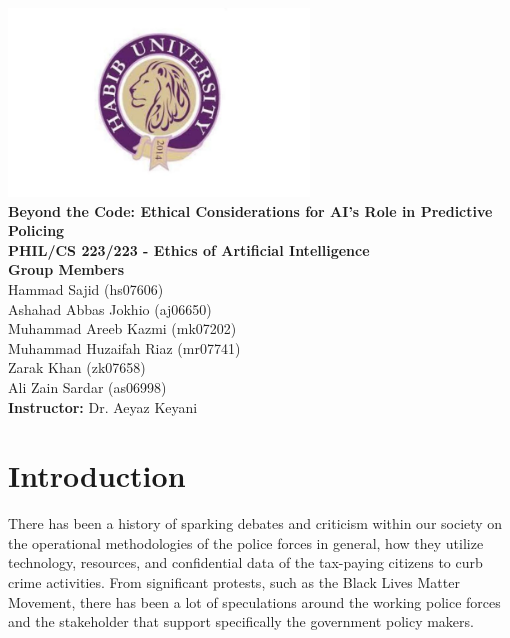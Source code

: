 \documentclass[man, noextraspace]{apa7} %
\begin{document}
\begin{center}
    {\includegraphics[width=8cm]{HabibLogo.png}} \\
    \vspace{10mm}
    {\LARGE \textbf{Beyond the Code: Ethical Considerations for AI's Role in Predictive Policing}} \\
    \vspace{5mm}
    {\Large \textbf{PHIL/CS 223/223 - Ethics of Artificial Intelligence}} \\
    \vspace{10mm}
    {\Large \textbf{Group Members}} \\
    \vspace{5mm}
    {\large Hammad Sajid (hs07606)} \\
    \vspace{2mm}
    {\large Ashahad Abbas Jokhio (aj06650)} \\
    \vspace{2mm}
    {\large Muhammad Areeb Kazmi (mk07202)} \\
    \vspace{2mm}
    {\large Muhammad Huzaifah Riaz (mr07741)} \\
    \vspace{2mm}
    {\large Zarak Khan (zk07658)} \\
    \vspace{2mm}
    {\large Ali Zain Sardar (as06998)}\\
    \vspace{4mm}
    {\large \textbf{Instructor:} Dr. Aeyaz Keyani} \\
\end{center}

\newpage

\tableofcontents
\newpage

\section{Introduction}
There has been a history of sparking debates and criticism within our society on the 
operational methodologies of the police forces in general, how they utilize technology, resources, 
and confidential data of the tax-paying citizens to curb crime activities. From significant protests,
such as the Black Lives Matter Movement, there has been a lot of speculations around the 
working police forces and the stakeholder that support specifically the government policy 
makers.
\end{document}

